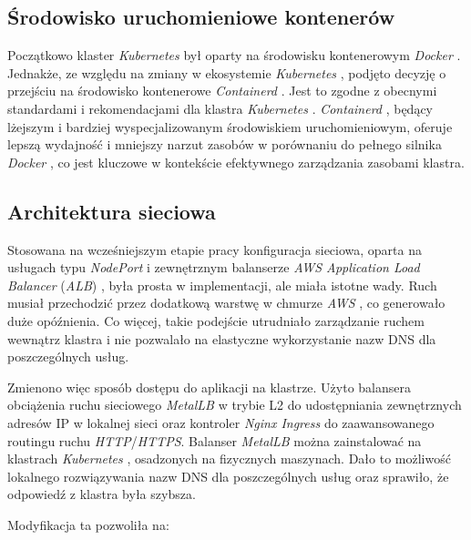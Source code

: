 \subsection{Środowisko uruchomieniowe kontenerów}

Początkowo klaster \textit{Kubernetes} \cite{kubernetes} był oparty na środowisku kontenerowym \textit{Docker} \cite{docker_docs}. Jednakże, ze względu na zmiany w ekosystemie \textit{Kubernetes} \cite{kubernetes}, podjęto decyzję o przejściu na środowisko kontenerowe \textit{Containerd} \cite{containerd_docs}. Jest to zgodne z obecnymi standardami i rekomendacjami dla klastra \textit{Kubernetes} \cite{kubernetes}. \textit{Containerd} \cite{containerd_docs}, będący lżejszym i bardziej wyspecjalizowanym środowiskiem uruchomieniowym, oferuje lepszą wydajność i mniejszy narzut zasobów w porównaniu do pełnego silnika \textit{Docker} \cite{docker_docs}, co jest kluczowe w kontekście efektywnego zarządzania zasobami klastra.

\subsection{Architektura sieciowa}

Stosowana na wcześniejszym etapie pracy konfiguracja sieciowa, oparta na usługach typu \textit{NodePort} \cite{nodeport_docs} i zewnętrznym balanserze \textit{AWS Application Load Balancer} (\textit{ALB}) \cite{alb_docs}, była prosta w implementacji, ale miała istotne wady. Ruch musiał przechodzić przez dodatkową warstwę w chmurze \textit{AWS} \cite{aws_docs}, co generowało duże opóźnienia. Co więcej, takie podejście utrudniało zarządzanie ruchem wewnątrz klastra i nie pozwalało na elastyczne wykorzystanie nazw DNS dla poszczególnych usług.

Zmienono więc sposób dostępu do aplikacji na klastrze. Użyto balansera obciążenia ruchu sieciowego \textit{MetalLB} \cite{metallb_docs} w trybie L2 do udostępniania zewnętrznych adresów IP w lokalnej sieci oraz kontroler \textit{Nginx Ingress} \cite{nginx_ingress_docs} do zaawansowanego routingu ruchu \textit{HTTP}/\textit{HTTPS}. Balanser \textit{MetalLB} \cite{metallb_docs} można zainstalować na klastrach \textit{Kubernetes} \cite{kubernetes}, osadzonych na fizycznych maszynach. Dało to możliwość lokalnego rozwiązywania nazw DNS dla poszczególnych usług oraz sprawiło, że odpowiedź z klastra była szybsza.

\newpage

Modyfikacja ta pozwoliła na:

